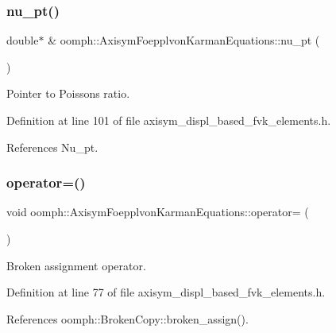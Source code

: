 \subsubsection{\texorpdfstring{nu\+\_\+pt()}{nu\_pt()}}
{\footnotesize\ttfamily double$\ast$ \& oomph\+::\+Axisym\+Foepplvon\+Karman\+Equations\+::nu\+\_\+pt (\begin{DoxyParamCaption}{ }\end{DoxyParamCaption})\hspace{0.3cm}{\ttfamily [inline]}}



Pointer to Poisson\textquotesingle{}s ratio. 



Definition at line 101 of file axisym\+\_\+displ\+\_\+based\+\_\+fvk\+\_\+elements.\+h.



References Nu\+\_\+pt.

\mbox{\label{classoomph_1_1AxisymFoepplvonKarmanEquations_aaac38681e3450e4c9159e9b0c1b39b85}} 
\subsubsection{\texorpdfstring{operator=()}{operator=()}\hspace{0.1cm}{\footnotesize\ttfamily [1/2]}}
{\footnotesize\ttfamily void oomph\+::\+Axisym\+Foepplvon\+Karman\+Equations\+::operator= (\begin{DoxyParamCaption}\item[{const \hyperlink{classoomph_1_1AxisymFoepplvonKarmanEquations}{Axisym\+Foepplvon\+Karman\+Equations} \&}]{ }\end{DoxyParamCaption})\hspace{0.3cm}{\ttfamily [inline]}}



Broken assignment operator. 



Definition at line 77 of file axisym\+\_\+displ\+\_\+based\+\_\+fvk\+\_\+elements.\+h.



References oomph\+::\+Broken\+Copy\+::broken\+\_\+assign().

